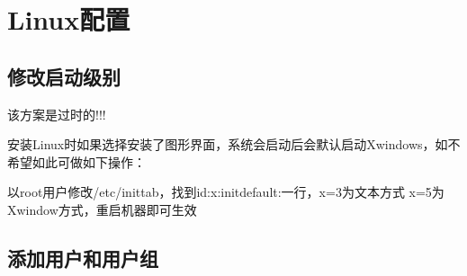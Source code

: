 \chapter{Linux配置}
\section{修改启动级别}
该方案是过时的!!!

安装Linux时如果选择安装了图形界面，系统会启动后会默认启动Xwindows，如不希望如此可做如下操作：

以root用户修改/etc/inittab，找到id:x:initdefault:一行，x=3为文本方式 x=5为Xwindow方式，重启机器即可生效

\section{添加用户和用户组}


